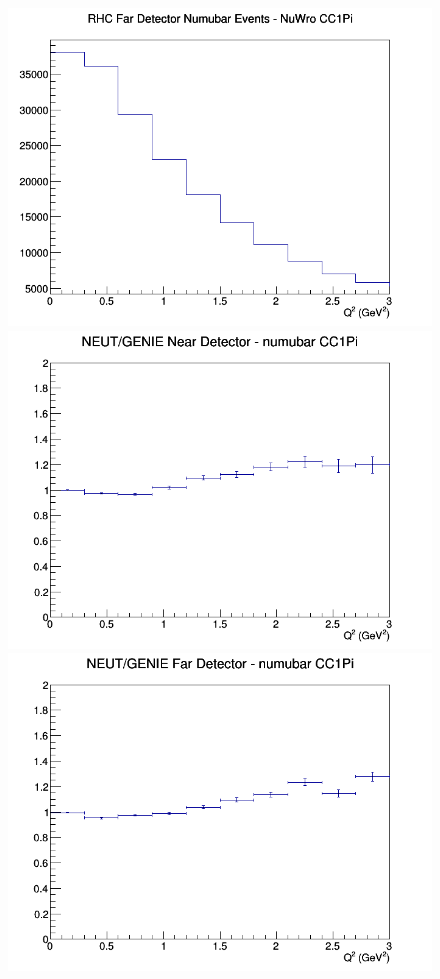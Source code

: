 \documentclass[12pt]{article}
\begin{document}
\begin{figure}[h]
\endminipage
{}
\includegraphics[width=\linewidth]{Q2/nominal/CC1Pi_RHC_FD_numubar_Q2_NuWro.png}
\endminipage
\newline
{}
\includegraphics[width=\linewidth]{Q2/nominal/ratios/CC1Pi_NEUT_GENIE_numubar_near_Q2.png}
\endminipage
{}
\includegraphics[width=\linewidth]{Q2/nominal/ratios/CC1Pi_NEUT_GENIE_numubar_far_Q2.png}

\end{figure}
\end{document}

